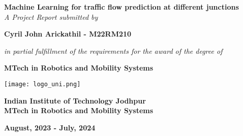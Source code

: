 \begin{titlepage}

    
    \begin{flushright}
        
   
       
    \vspace*{3\baselineskip}

    
   

    {\LARGE \bfseries Machine Learning for traffic flow prediction at different junctions}\\[0.3cm]
    
    \vspace*{4\baselineskip}
    {\Large \itshape A Project Report submitted by}
    \vspace*{1\baselineskip}

    {\Large  \bfseries Cyril John Arickathil - M22RM210 }

   
    \vspace*{4\baselineskip}




     {\large \itshape in partial fulfillment of the requirements for the award of the degree of} 
    \vspace*{0.5\baselineskip}

    {\Large \bfseries  MTech in Robotics and Mobility Systems }  
    \vspace*{2\baselineskip}



    \texttt{[image: logo\_uni.png]}
    \vspace*{2\baselineskip}

    {\Large \bfseries  Indian Institute of Technology Jodhpur }  \\
    \vspace*{1\baselineskip}
    {\Large \bfseries  MTech in Robotics and Mobility Systems }  
    \vspace*{1\baselineskip}

    {\Large \bfseries  August, 2023 - July, 2024 }  

    

\end{flushright}
   
    
\end{titlepage}